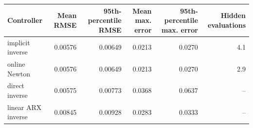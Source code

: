 \begin{tabular}{lrrrrr}
\toprule
Controller & Mean RMSE & 95th-percentile RMSE & Mean max. error & 95th-percentile max. error & Hidden evaluations \\
\midrule
implicit inverse & 0.00576 & 0.00649 & 0.0213 & 0.0270 & 4.1 \\
online Newton & 0.00576 & 0.00649 & 0.0213 & 0.0270 & 2.9 \\
direct inverse & 0.00575 & 0.00773 & 0.0368 & 0.0637 & -- \\
linear ARX inverse & 0.00845 & 0.00928 & 0.0283 & 0.0333 & -- \\
\bottomrule
\end{tabular}
